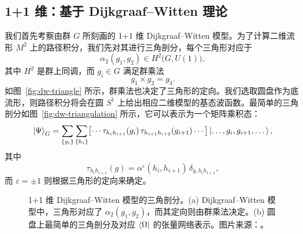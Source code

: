\subsection{1+1 维：基于 Dijkgraaf--Witten 理论}
\label{subsec:holographic-tensor-network-1+1d}

我们首先考察由群 $G$ 所刻画的 1+1 维 Dijkgraaf--Witten 模型\cite{dijkgraaf1990topological}。为了计算二维流形 $M^2$ 上的路径积分，我们先对其进行三角剖分，每个三角形对应于
\begin{equation}
  \alpha_2(g_1, g_2) \in H^2 \bigl( G, U(1) \bigr),
\end{equation}
其中 $H^2$ 是群上同调，而 $g_i\in G$ 满足群乘法
\begin{equation}
  g_1 \times g_2 = g_3.
\end{equation}
如图~\ref{fig:dw-triangle} 所示，群乘法也决定了三角形的定向。我们选取圆盘作为底流形，则路径积分将会在圆 $S^1$ 上给出相应二维模型的基态波函数。最简单的三角剖分如图~\ref{fig:dw-triangulation} 所示，它可以表示为一个矩阵乘积态：
\begin{equation}
    \ket{\Psi}_G
  = \sum_{\{g_i\}} \sum_{\{h_i\}}
    \bigl[ \cdots \tau_{h_i h_{i+1}}(g_i) \, \tau_{h_{i+1} h_{i+2}}(g_{i+1}) \cdots \bigr]
    \ket{\dots, g_i, g_{i+1}, \dots},
\end{equation}
其中
\begin{equation}
  \tau_{h_i h_{i+1}}(g) = \alpha^\varepsilon(h_i, h_{i+1}) \, \delta_{g, h_i h_{i+1}},
\end{equation}
而 $\varepsilon=\pm1$ 则根据三角形的定向来确定。

\begin{figure}[htb]
  \centering
   \quad
  \caption[1+1 维 Dijkgraaf--Witten 模型的三角剖分]{1+1 维 Dijkgraaf--Witten 模型的三角剖分。(a) Dijkgraaf--Witten 模型中，三角形对应了 $\alpha_2(g_1, g_2)$，而其定向则由群乘法决定。(b) 圆盘上最简单的三角剖分及对应 $\bra{\Omega}$ 的张量网络表示。图片来源：\parencite{chen2022exact}。}
\end{figure}


